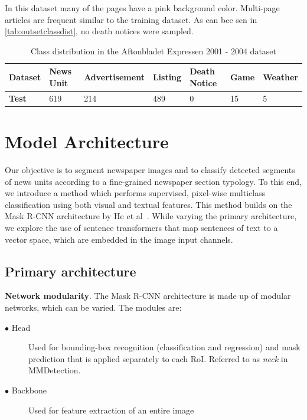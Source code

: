 \documentclass[oneside, english, bibtex]{kththesis}
\begin{document}
In this dataset many of the pages have a pink background color. Multi-page articles are frequent similar to the training dataset. As can bee sen in \autoref{tab:outsetclassdist}, no death notices were sampled. 

\begin{table}[!ht]
  \begin{center}
    \caption{Class distribution in the Aftonbladet Expressen 2001 - 2004 dataset}
    \label{tab:outsetclassdist}
    \begin{tabular}{l|l|l|l|l|l|l} %
    \textbf{Dataset} & \textbf{News Unit} & \textbf{Advertisement} & \textbf{Listing} & \textbf{Death Notice} & \textbf{Game} & \textbf{Weather}  \\
    \hline
    \textbf{Test} & 619 & 214 & 489 & 0 & 15 & 5 \\    \hline
    \end{tabular}
  \end{center}
\end{table}

\clearpage

\section{Model Architecture}
\label{sec:modelarch}

Our objective is to segment newspaper images and to classify detected segments of news units according to a fine-grained newspaper section typology. To this end, we introduce a method which performs supervised, pixel-wise multiclass classification using both visual and textual features. This method builds on the Mask R-CNN architecture by He et al~\cite{DBLP:journals/corr/HeGDG17}. While varying the primary architecture, we explore the use of sentence transformers that map sentences of text to a vector space, which are embedded in the image input channels.

\subsection{Primary architecture}

\textbf{Network modularity}. The Mask R-CNN architecture is made up of modular networks, which can be varied. The modules are:

\begin{description}
\item[$\bullet$ Head] Used for bounding-box recognition (classification and regression) and mask prediction that is applied separately to each RoI. Referred to as \textit{neck} in MMDetection.
\item[$\bullet$ Backbone] Used for feature extraction of an entire image
\end{description}
\end{document}
